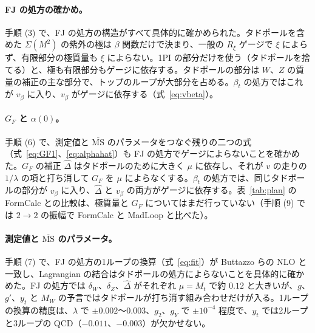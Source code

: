 \documentclass[a4paper,10pt]{ltjsarticle}
\newcommand{\MSbar}{\overline{\mathrm{MS}}}
\begin{document}
\paragraph{FJ の処方の確かめ。}手順 (3) で、FJ の処方の構造がすべて具体的に確かめられた。タドポールを含めた $\Sigma(M^2)$ の紫外の極は $\beta$ 関数だけで決まり、一般の $R_\xi$ ゲージで $\xi$ によらず、有限部分の極質量も $\xi$ によらない。1PI の部分だけを使う（タドポールを捨てる）と、極も有限部分もゲージに依存する。タドポールの部分は $W$、$Z$ の質量の補正の主な部分で、トップのループが大部分を占める。$\beta_t$ の処方ではこれが $v_\beta$ に入り、$v_\beta$ がゲージに依存する（式~\eqref{eq:vbeta}）。

\paragraph{$G_F$ と $\alpha(0)$。}手順 (6) で、測定値と $\MSbar$ のパラメータをつなぐ残りの二つの式（式~\eqref{eq:GF1}、\eqref{eq:alphahat}）も FJ の処方でゲージによらないことを確かめた。$G_F$ の補正 $\hat\Delta$ はタドポールのために大きく $\mu$ に依存し、それが $v$ の走りの $1/\lambda$ の項と打ち消して $G_F$ を $\mu$ によらなくする。$\beta_t$ の処方では、同じタドポールの部分が $v_\beta$ に入り、$\hat\Delta$ と $v_\beta$ の両方がゲージに依存する。表~\ref{tab:plan} の FormCalc との比較は、極質量と $G_F$ についてはまだ行っていない（手順 (9) では $2\to2$ の振幅で FormCalc と MadLoop と比べた）。

\paragraph{測定値と $\MSbar$ のパラメータ。}手順 (7) で、FJ の処方の1ループの換算（式~\eqref{eq:fit}）が Buttazzo らの NLO と一致し、Lagrangian の結合はタドポールの処方によらないことを具体的に確かめた。FJ の処方では $\delta_W$、$\delta_Z$、$\hat\Delta$ がそれぞれ $\mu=M_t$ で約 $0.12$ と大きいが、$g$、$g'$、$y_t$ と $M_W$ の予言ではタドポールが打ち消す組み合わせだけが入る。1ループの換算の精度は、$\lambda$ で $\pm0.002$〜$0.003$、$g_2$、$g_Y$ で $\pm10^{-4}$ 程度で、$y_t$ では2ループと3ループの QCD（$-0.011$、$-0.003$）が欠かせない。
\end{document}
